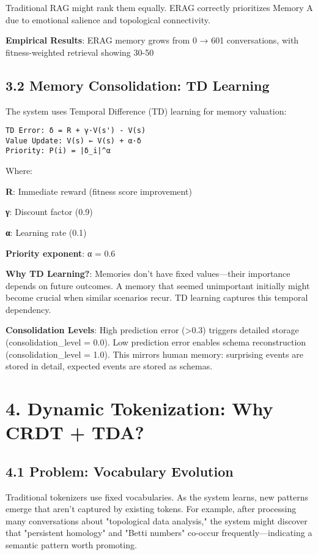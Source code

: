 \documentclass[11pt,a4paper]{article}
\begin{document}
Traditional RAG might rank them equally. ERAG correctly prioritizes Memory A due to emotional salience and topological connectivity.

\textbf{Empirical Results}: ERAG memory grows from 0 → 601 conversations, with fitness-weighted retrieval showing 30-50%

\subsection{3.2 Memory Consolidation: TD Learning}

The system uses Temporal Difference (TD) learning for memory valuation:

\begin{verbatim}TD Error: δ = R + γ·V(s') - V(s)
Value Update: V(s) ← V(s) + α·δ
Priority: P(i) = |δ_i|^α
\end{verbatim}

Where:
\item \textbf{R}: Immediate reward (fitness score improvement)
\item \textbf{γ}: Discount factor (0.9)
\item \textbf{α}: Learning rate (0.1)
\item \textbf{Priority exponent}: α = 0.6

\textbf{Why TD Learning?}: Memories don't have fixed values—their importance depends on future outcomes. A memory that seemed unimportant initially might become crucial when similar scenarios recur. TD learning captures this temporal dependency.

\textbf{Consolidation Levels}: High prediction error (>0.3) triggers detailed storage (consolidation_level = 0.0). Low prediction error enables schema reconstruction (consolidation_level = 1.0). This mirrors human memory: surprising events are stored in detail, expected events are stored as schemas.

\section{4. Dynamic Tokenization: Why CRDT + TDA?}

\subsection{4.1 Problem: Vocabulary Evolution}

Traditional tokenizers use fixed vocabularies. As the system learns, new patterns emerge that aren't captured by existing tokens. For example, after processing many conversations about "topological data analysis," the system might discover that "persistent homology" and "Betti numbers" co-occur frequently—indicating a semantic pattern worth promoting.
\end{document}
